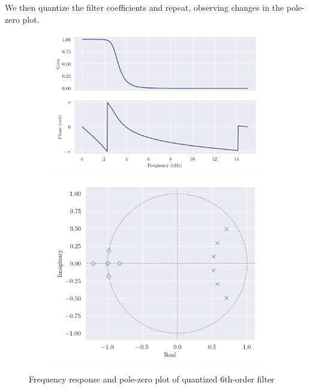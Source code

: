 We then quantize the filter coefficients and repeat, observing changes in the pole-zero plot.

\begin{figure}[!ht]
    \centering
    \begin{subfigure}[b]{0.58\textwidth}
        \centering
        \includegraphics[width=\textwidth]{images/q8_q6th_freqz.png}
    \end{subfigure}
    \hfill
    \begin{subfigure}[b]{0.41\textwidth}
        \centering
        \includegraphics[width=\textwidth]{images/q8_q6th_zp.png}
    \end{subfigure}
    \caption{Frequency response and pole-zero plot of quantized 6th-order filter}
\end{figure}

